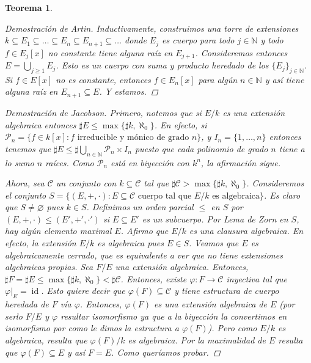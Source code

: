 \documentclass[12pt]{book}
\newtheorem{teo}{Teorema}[section]
\theoremstyle{definition}
\newcommand{\NN}{\mathbb{N}}
\let\emptyset\varnothing
\DeclareMathOperator{\id}{id}
\begin{document}
\begin{teo}
\begin{proof}[Demostración de Artin]
Inductivamente, construimos una torre de extensiones $k\subseteq E_1\subseteq \ldots \subseteq E_n\subseteq E_{n+1}\subseteq \ldots$ donde $E_j$ es cuerpo para todo $j\in\NN$ y todo $f\in E_j[x]$ no constante tiene alguna raíz en $E_{j+1}$. Consideremos entonces $E = \displaystyle\bigcup_{j\geq 1} E_j$. Esto es un cuerpo con suma y producto heredado de los $\{E_j\}_{j\in\NN}$. Si $f\in E[x]$ no es constante, entonces $f\in E_n[x]$ para algún $n\in\NN$ y así tiene alguna raíz en $E_{n+1}\subseteq E$. Y estamos.
\end{proof}
\begin{proof}[Demostración de Jacobson]
Primero, notemos que si $E/k$ es una extensión algebraica entonces $\sharp E \leq \max\{\sharp k, \aleph_0\}$. En efecto, si $\mathscr{P}_n = \{f\in k[x] : f\text{ irreducible y mónico de grado } n\}$, y $I_n=\{1,\ldots, n\}$ entonces tenemos que $\sharp E \leq \sharp\displaystyle\bigcup_{n\in \NN} \mathscr{P}_n\times I_n$ puesto que cada polinomio de grado $n$ tiene a lo sumo $n$ raíces. Como $\mathscr{P}_n$ está en biyección con $k^{n}$, la afirmación sigue.

Ahora, sea $\mathscr{C}$ un conjunto con $k\subseteq \mathscr{C}$ tal que $\sharp \mathscr{C} > \max\{\sharp k , \aleph_0\}$. Consideremos el conjunto $S=\{(E,+,\cdot): E\subseteq \mathscr{C} \text{ cuerpo tal que }E/k \text{ es algebraica}\}$. Es claro que $S\neq\emptyset$ pues $k\in S$. Definimos un orden parcial $\leq$ en $S$ por $(E,+,\cdot)\leq (E',+',\cdot')$ si $E\subseteq E'$ es un subcuerpo. Por Lema de Zorn en $S$, hay algún elemento maximal $E$. Afirmo que $E/k$ es una clausura algebraica. En efecto, la extensión $E/k$ es algebraica pues $E\in S$. Veamos que $E$ es algebraicamente cerrado, que es equivalente a ver que no tiene extensiones algebraicas propias. Sea $F/E$ una extensión algebraica. Entonces, $\sharp F= \sharp E\leq \max\{\sharp k,\aleph_0\} < \sharp\mathscr{C}$. Entonces, existe $\varphi:F\to \mathscr{C}$ inyectiva tal que $\left.\varphi\right|_{E}=\id$. Esto quiere decir que $\varphi(F)\subseteq\mathscr{C}$ y tiene estructura de cuerpo heredada de $F$ vía $\varphi$. Entonces, $\varphi(F)$ es una extensión algebraica de $E$ (por serlo $F/E$ y $\varphi$ resultar isomorfismo ya que a la biyección la convertimos en isomorfismo por como le dimos la estructura a $\varphi(F)$). Pero como $E/k$ es algebraica, resulta que $\varphi(F)/k$ es algebraica. Por la maximalidad de $E$ resulta que $\varphi(F)\subseteq E$ y así $F=E$. Como queríamos probar.

\end{proof}
\end{teo}
\end{document}

